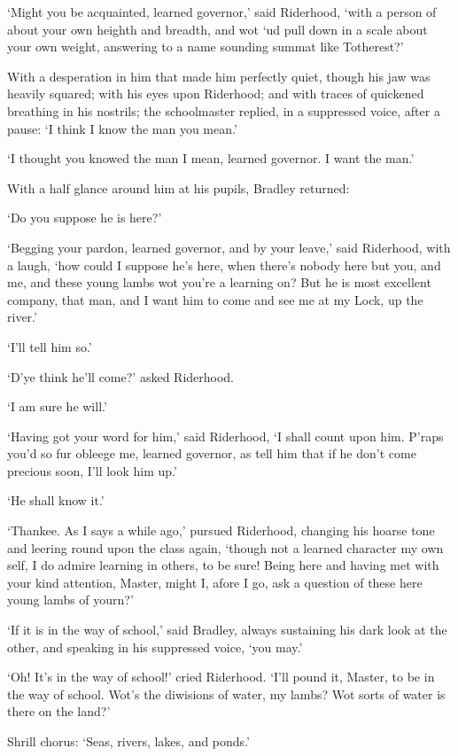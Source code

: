 ‘Might you be acquainted, learned governor,’ said Riderhood, ‘with a
person of about your own heighth and breadth, and wot ‘ud pull down in
a scale about your own weight, answering to a name sounding summat like
Totherest?’

With a desperation in him that made him perfectly quiet, though his jaw
was heavily squared; with his eyes upon Riderhood; and with traces of
quickened breathing in his nostrils; the schoolmaster replied, in a
suppressed voice, after a pause: ‘I think I know the man you mean.’

‘I thought you knowed the man I mean, learned governor. I want the man.’

With a half glance around him at his pupils, Bradley returned:

‘Do you suppose he is here?’

‘Begging your pardon, learned governor, and by your leave,’ said
Riderhood, with a laugh, ‘how could I suppose he’s here, when there’s
nobody here but you, and me, and these young lambs wot you’re a learning
on? But he is most excellent company, that man, and I want him to come
and see me at my Lock, up the river.’

‘I’ll tell him so.’

‘D’ye think he’ll come?’ asked Riderhood.

‘I am sure he will.’

‘Having got your word for him,’ said Riderhood, ‘I shall count upon him.
P’raps you’d so fur obleege me, learned governor, as tell him that if he
don’t come precious soon, I’ll look him up.’

‘He shall know it.’

‘Thankee. As I says a while ago,’ pursued Riderhood, changing his hoarse
tone and leering round upon the class again, ‘though not a learned
character my own self, I do admire learning in others, to be sure! Being
here and having met with your kind attention, Master, might I, afore I
go, ask a question of these here young lambs of yourn?’

‘If it is in the way of school,’ said Bradley, always sustaining his
dark look at the other, and speaking in his suppressed voice, ‘you may.’

‘Oh! It’s in the way of school!’ cried Riderhood. ‘I’ll pound it,
Master, to be in the way of school. Wot’s the diwisions of water, my
lambs? Wot sorts of water is there on the land?’

Shrill chorus: ‘Seas, rivers, lakes, and ponds.’

